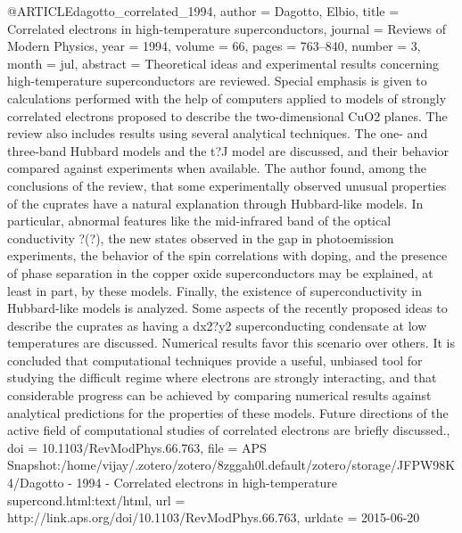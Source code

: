 @ARTICLE{dagotto_correlated_1994,
  author = {Dagotto, Elbio},
  title = {Correlated electrons in high-temperature superconductors},
  journal = {Reviews of Modern Physics},
  year = {1994},
  volume = {66},
  pages = {763--840},
  number = {3},
  month = jul,
  abstract = {Theoretical ideas and experimental results concerning high-temperature
	superconductors are reviewed. Special emphasis is given to calculations
	performed with the help of computers applied to models of strongly
	correlated electrons proposed to describe the two-dimensional CuO2
	planes. The review also includes results using several analytical
	techniques. The one- and three-band Hubbard models and the t?J model
	are discussed, and their behavior compared against experiments when
	available. The author found, among the conclusions of the review,
	that some experimentally observed unusual properties of the cuprates
	have a natural explanation through Hubbard-like models. In particular,
	abnormal features like the mid-infrared band of the optical conductivity
	?(?), the new states observed in the gap in photoemission experiments,
	the behavior of the spin correlations with doping, and the presence
	of phase separation in the copper oxide superconductors may be explained,
	at least in part, by these models. Finally, the existence of superconductivity
	in Hubbard-like models is analyzed. Some aspects of the recently
	proposed ideas to describe the cuprates as having a dx2?y2 superconducting
	condensate at low temperatures are discussed. Numerical results favor
	this scenario over others. It is concluded that computational techniques
	provide a useful, unbiased tool for studying the difficult regime
	where electrons are strongly interacting, and that considerable progress
	can be achieved by comparing numerical results against analytical
	predictions for the properties of these models. Future directions
	of the active field of computational studies of correlated electrons
	are briefly discussed.},
  doi = {10.1103/RevModPhys.66.763},
  file = {APS Snapshot:/home/vijay/.zotero/zotero/8zggah0l.default/zotero/storage/JFPW98K4/Dagotto - 1994 - Correlated electrons in high-temperature supercond.html:text/html},
  url = {http://link.aps.org/doi/10.1103/RevModPhys.66.763},
  urldate = {2015-06-20}
}

